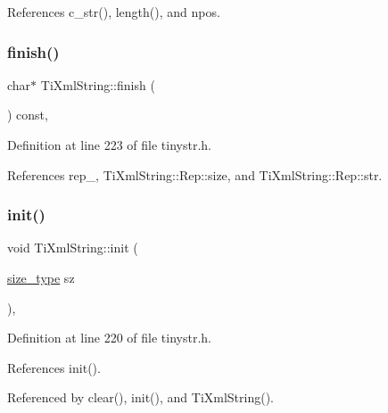 References c\+\_\+str(), length(), and npos.

\hypertarget{class_ti_xml_string_a363decd99ced2e5c2907ffceac3faa31}{}\label{class_ti_xml_string_a363decd99ced2e5c2907ffceac3faa31} 
\subsubsection{\texorpdfstring{finish()}{finish()}}
{\footnotesize\ttfamily char$\ast$ Ti\+Xml\+String\+::finish (\begin{DoxyParamCaption}{ }\end{DoxyParamCaption}) const\hspace{0.3cm}{\ttfamily [inline]}, {\ttfamily [private]}}



Definition at line 223 of file tinystr.\+h.



References rep\+\_\+, Ti\+Xml\+String\+::\+Rep\+::size, and Ti\+Xml\+String\+::\+Rep\+::str.

\hypertarget{class_ti_xml_string_a694eacb51c43d8eba8aa7d4552b598ff}{}\label{class_ti_xml_string_a694eacb51c43d8eba8aa7d4552b598ff} 
\subsubsection{\texorpdfstring{init()}{init()}\hspace{0.1cm}{\footnotesize\ttfamily [1/2]}}
{\footnotesize\ttfamily void Ti\+Xml\+String\+::init (\begin{DoxyParamCaption}\item[{\hyperlink{class_ti_xml_string_abeb2c1893a04c17904f7c06546d0b971}{size\+\_\+type}}]{sz }\end{DoxyParamCaption})\hspace{0.3cm}{\ttfamily [inline]}, {\ttfamily [private]}}



Definition at line 220 of file tinystr.\+h.



References init().



Referenced by clear(), init(), and Ti\+Xml\+String().

\hypertarget{class_ti_xml_string_ae11cd23e090fd2e7bb62eda05b45a2d6}{}\label{class_ti_xml_string_ae11cd23e090fd2e7bb62eda05b45a2d6} 
